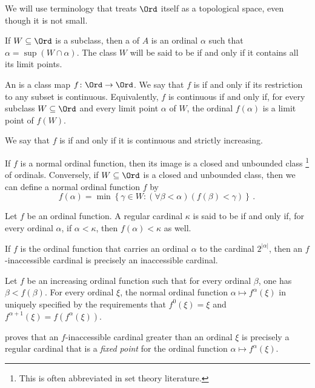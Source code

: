 We will use terminology 
that treats $ \Ord $ itself as a topological space,
even though it is not small.

\begin{definition}
	If $ W \subseteq \Ord $ is a subclass,
	then a  of $ A $ is
	an ordinal $ \alpha $ such that $ \alpha = \sup (W \cap \alpha) $.
	The class $ W $ will be said to be  if and only if
	it contains all its limit points.

	An  is a class map $ f \colon \Ord \to \Ord $.
	We say that $ f $ is  if and only if
	its restriction to any subset is continuous.
	Equivalently, $ f $ is continuous if and only if,
	for every subclass $ W \subseteq \Ord $
	and every limit point $ \alpha $ of $ W $,
	the ordinal $ f(\alpha) $ is a limit point of $ f(W) $.

	We say that $ f $ is  if and only if
	it is continuous and strictly increasing.
\end{definition}

\begin{nul}
	If $ f $ is a normal ordinal function,
	then its image is a closed and unbounded class%
	\footnote{This is often abbreviated  in
	set theory literature.}
	of ordinals.
	Conversely, if $ W \subseteq \Ord $ is a closed and unbounded class,
	then we can define a normal ordinal function $ f $ by
	\[
		f(\alpha) = \min \left\{ \gamma \in W : (\forall \beta < \alpha)(f(\beta) < \gamma) \right\} \period
	\]
\end{nul}

\begin{definition}
	Let $ f $ be an ordinal function.
	A regular cardinal $ \kappa $ is said to be
	 if and only if,
	for every ordinal $ \alpha$, if $ \alpha < \kappa $,
	then $ f(\alpha) < \kappa $ as well.
\end{definition}

\begin{eg}
	If $ f $ is the ordinal function that carries
	an ordinal $ \alpha $ to the cardinal $ 2^{|\alpha|} $,
	then an $ f $-inaccessible cardinal is precisely
	an inaccessible cardinal.
\end{eg}

\begin{construction}
	Let $ f $ be an increasing ordinal function
	such that for every ordinal $ \beta $, one has $ \beta < f(\beta) $.
	For every ordinal $ \xi $,
	the normal ordinal function $ \alpha \mapsto f^{\alpha}(\xi) $
	in uniquely specified by the requirements that
	$ f^0(\xi) = \xi $ and $ f^{\alpha + 1}(\xi) =f(f^{\alpha}(\xi)) $.

	\cite{Jorgensen1970} proves that an $ f $-inaccessible cardinal
	greater than an ordinal $ \xi $
	is precisely a regular cardinal that is a \emph{fixed point}
	for the ordinal function $ \alpha \mapsto f^{\alpha}(\xi) $.
\end{construction}

